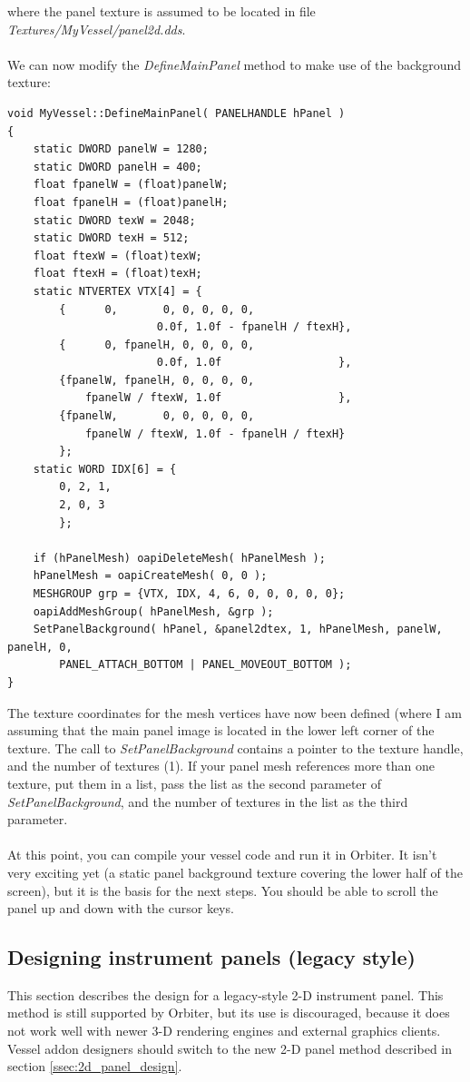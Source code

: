 \documentclass[Orbiter Developer Manual.tex]{subfiles}
\begin{document}
\noindent
where the panel texture is assumed to be located in file \textit{Textures/MyVessel/panel2d.dds}.\\
\\
We can now modify the \textit{DefineMainPanel} method to make use of the background texture:

\begin{lstlisting}
void MyVessel::DefineMainPanel( PANELHANDLE hPanel )
{
	static DWORD panelW = 1280;
	static DWORD panelH = 400;
	float fpanelW = (float)panelW;
	float fpanelH = (float)panelH;
	static DWORD texW = 2048;
	static DWORD texH = 512;
	float ftexW = (float)texW;
	float ftexH = (float)texH;
	static NTVERTEX VTX[4] = {
		{      0,       0, 0, 0, 0, 0,
			           0.0f, 1.0f - fpanelH / ftexH},
		{      0, fpanelH, 0, 0, 0, 0,
			           0.0f, 1.0f                  },
		{fpanelW, fpanelH, 0, 0, 0, 0,
			fpanelW / ftexW, 1.0f                  },
		{fpanelW,       0, 0, 0, 0, 0,
			fpanelW / ftexW, 1.0f - fpanelH / ftexH}
		};
	static WORD IDX[6] = {
		0, 2, 1,
		2, 0, 3
		};

	if (hPanelMesh) oapiDeleteMesh( hPanelMesh );
	hPanelMesh = oapiCreateMesh( 0, 0 );
	MESHGROUP grp = {VTX, IDX, 4, 6, 0, 0, 0, 0, 0};
	oapiAddMeshGroup( hPanelMesh, &grp );
	SetPanelBackground( hPanel, &panel2dtex, 1, hPanelMesh, panelW, panelH, 0,
		PANEL_ATTACH_BOTTOM | PANEL_MOVEOUT_BOTTOM );
}
\end{lstlisting}

\noindent
The texture coordinates for the mesh vertices have now been defined (where I am assuming that the main panel image is located in the lower left corner of the texture. The call to \textit{SetPanelBackground} contains a pointer to the texture handle, and the number of textures (1). If your panel mesh references more than one texture, put them in a list, pass the list as the second parameter of \textit{SetPanelBackground}, and the number of textures in the list as the third parameter.\\
\\
At this point, you can compile your vessel code and run it in Orbiter. It isn't very exciting yet (a static panel background texture covering the lower half of the screen), but it is the basis for the next steps. You should be able to scroll the panel up and down with the cursor keys.


\subsection{Designing instrument panels (legacy style)}
This section describes the design for a legacy-style 2-D instrument panel. This method is still supported by Orbiter, but its use is discouraged, because it does not work well with newer 3-D rendering engines and external graphics clients. Vessel addon designers should switch to the new 2-D panel method described in section \ref{ssec:2d_panel_design}.
\end{document}
